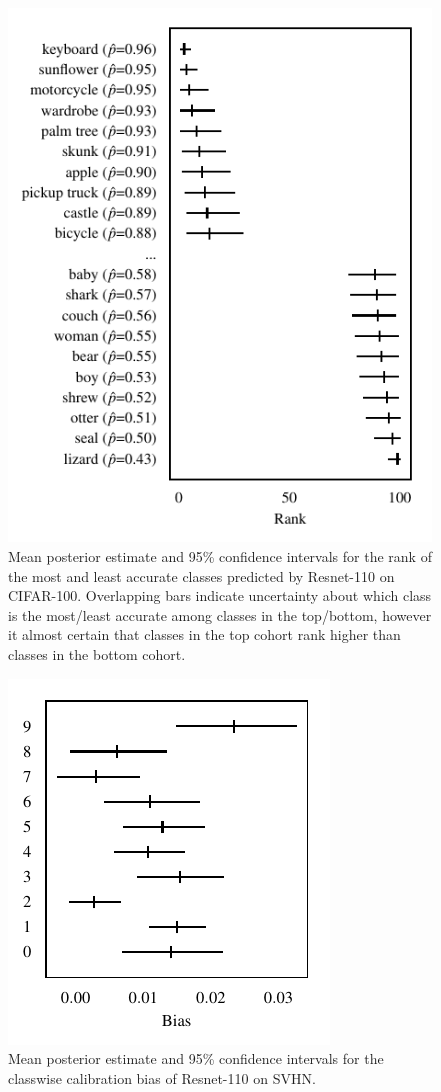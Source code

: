\documentclass{article}
\begin{document}
\begin{figure}[t]
    \centering
    \includegraphics{figures/cifar100_rank.pdf}  
    \caption{
        Mean posterior estimate and 95\% confidence intervals for the rank of the most and least accurate classes predicted by Resnet-110 on CIFAR-100.
        Overlapping bars indicate uncertainty about which class is the most/least accurate among classes in the top/bottom, however it almost certain that classes in the top cohort rank higher than classes in the bottom cohort.
    }
    \label{fig:cifar100_rank}
\end{figure}

\begin{figure}[t]
    \centering
    \includegraphics{figures/svhn_bias.pdf}  
    \caption{
        Mean posterior estimate and 95\% confidence intervals for the classwise calibration bias of Resnet-110 on SVHN.
    }
    \label{fig:svhn_bias}
\end{figure}
\end{document}
